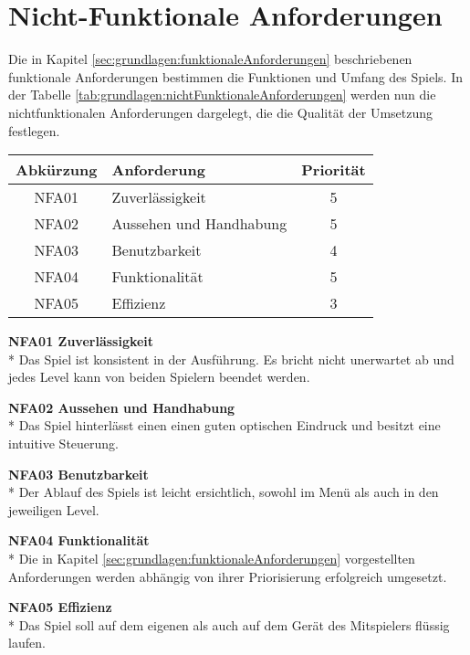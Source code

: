\section{Nicht-Funktionale Anforderungen}
\label{sec:grundlagen:nichtFunktionaleAnforderungen}
Die in Kapitel \ref{sec:grundlagen:funktionaleAnforderungen} beschriebenen funktionale Anforderungen bestimmen die Funktionen und Umfang des Spiels. In der Tabelle \ref{tab:grundlagen:nichtFunktionaleAnforderungen} werden nun die nichtfunktionalen Anforderungen dargelegt, die die Qualität der Umsetzung festlegen.

\begin{center}
    \label{tab:grundlagen:nichtFunktionaleAnforderungen}
    \begin{tabular}{ c | l | c}
        Abkürzung & Anforderung & Priorität\\
        \hline
        NFA01 & Zuverlässigkeit & 5 \\
        \hline
        NFA02 & Aussehen und Handhabung & 5 \\
        \hline
        NFA03 & Benutzbarkeit & 4 \\
        \hline
        NFA04 & Funktionalität & 5 \\
        \hline
        NFA05 & Effizienz & 3 \\
    \end{tabular}
\end{center}

\textbf{NFA01 Zuverlässigkeit}\\*
Das Spiel ist konsistent in der Ausführung. Es bricht nicht unerwartet ab und jedes Level kann von beiden Spielern beendet werden.

\textbf{NFA02 Aussehen und Handhabung}\\*
Das Spiel hinterlässt einen einen guten optischen Eindruck und besitzt eine intuitive Steuerung.

\textbf{NFA03 Benutzbarkeit}\\*
Der Ablauf des Spiels ist leicht ersichtlich, sowohl im Menü als auch in den jeweiligen Level.

\textbf{NFA04 Funktionalität}\\*
Die in Kapitel \ref{sec:grundlagen:funktionaleAnforderungen} vorgestellten Anforderungen werden abhängig von ihrer Priorisierung erfolgreich umgesetzt.

\textbf{NFA05 Effizienz}\\*
Das Spiel soll auf dem eigenen als auch auf dem Gerät des Mitspielers flüssig laufen. 



